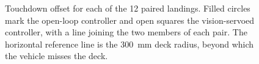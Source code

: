 \begin{figure}[!t]
\centering
\caption{Touchdown offset for each of the 12 paired landings. Filled circles mark the
open-loop controller and open squares the vision-servoed controller, with a line joining
the two members of each pair. The horizontal reference line is the 300~mm deck radius,
beyond which the vehicle misses the deck.}
\label{fig:offsets}
\end{figure}
